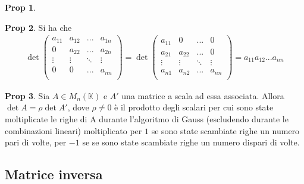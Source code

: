 \documentclass[]{article}
\theoremstyle{definition}
\theoremstyle{definition}
\newtheorem{prop}{Prop}[subsection]
\theoremstyle{definition}
\begin{document}
\begin{prop}
\end{prop} \begin{prop} Si ha che
$$
\begin{aligned}
\det
\begin{pmatrix}
	a_{11}	& a_{12}	& ...		& a_{1n}	\\
	0		& a_{22}	& ...		& a_{2n}	\\
	\vdots	& \vdots	& \ddots	& \vdots	\\
	0		& 0			& ...		& a_{nn}	\\
\end{pmatrix}
=
\det
\begin{pmatrix}
	a_{11}	& 0			& ...		& 0			\\
	a_{21}	& a_{22}	& ...		& 0			\\
	\vdots	& \vdots	& \ddots	& \vdots	\\
	a_{n1}	& a_{n2}	& ...		& a_{nn}	\\
\end{pmatrix}
= a_{11} a_{12} ... a_{nn}
\end{aligned}
$$

\end{prop} \begin{prop} Sia $A \in M_n ({\mathbb{K}})$ e $A'$ una matrice a scala ad essa associata. Allora $\det A = \rho \det A'$, dove $\rho \neq 0$ è il prodotto degli scalari per cui sono state moltiplicate le righe di A durante l'algoritmo di Gauss (escludendo durante le combinazioni lineari) moltiplicato per $1$ se sono state scambiate righe un numero pari di volte, per $-1$ se se sono state scambiate righe un numero dispari di volte.
\end{prop}

\subsection{Matrice inversa} 
\end{document}
